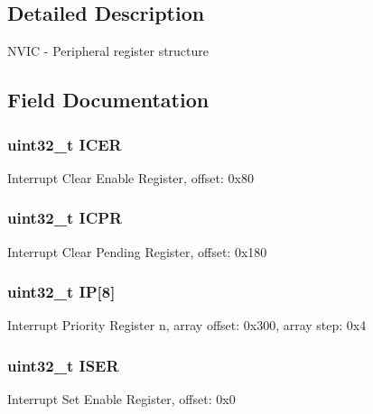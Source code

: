 \subsection{Detailed Description}
N\+V\+I\+C -\/ Peripheral register structure 

\subsection{Field Documentation}
\hypertarget{struct_n_v_i_c___mem_map_a60d6d4189f66d2ee451e0516db827fd1}{}
\subsubsection[{I\+C\+E\+R}]{\setlength{\rightskip}{0pt plus 5cm}uint32\+\_\+t I\+C\+E\+R}\label{struct_n_v_i_c___mem_map_a60d6d4189f66d2ee451e0516db827fd1}
Interrupt Clear Enable Register, offset\+: 0x80 \hypertarget{struct_n_v_i_c___mem_map_a2dcec5c8c1f5ce5c6121b5b718b1b685}{}
\subsubsection[{I\+C\+P\+R}]{\setlength{\rightskip}{0pt plus 5cm}uint32\+\_\+t I\+C\+P\+R}\label{struct_n_v_i_c___mem_map_a2dcec5c8c1f5ce5c6121b5b718b1b685}
Interrupt Clear Pending Register, offset\+: 0x180 \hypertarget{struct_n_v_i_c___mem_map_a1f22f7bba4536ada7f0655d30ac628d4}{}
\subsubsection[{I\+P}]{\setlength{\rightskip}{0pt plus 5cm}uint32\+\_\+t I\+P\mbox{[}8\mbox{]}}\label{struct_n_v_i_c___mem_map_a1f22f7bba4536ada7f0655d30ac628d4}
Interrupt Priority Register n, array offset\+: 0x300, array step\+: 0x4 \hypertarget{struct_n_v_i_c___mem_map_aef94884a5cbb2f5260df2e30cf0c954f}{}
\subsubsection[{I\+S\+E\+R}]{\setlength{\rightskip}{0pt plus 5cm}uint32\+\_\+t I\+S\+E\+R}\label{struct_n_v_i_c___mem_map_aef94884a5cbb2f5260df2e30cf0c954f}
Interrupt Set Enable Register, offset\+: 0x0 \hypertarget{struct_n_v_i_c___mem_map_a9948e5816be3cb53ef9d27229eaf2d84}{}
